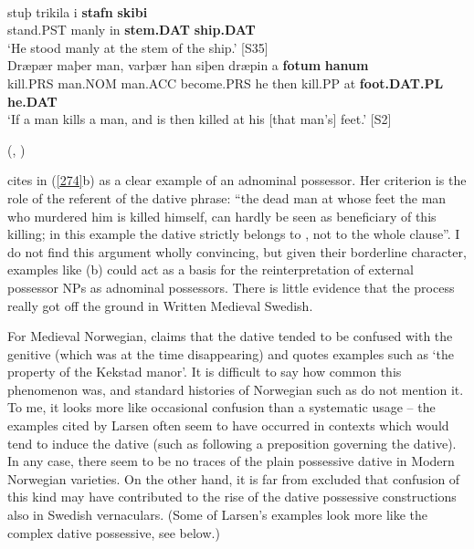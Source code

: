\ea\label{}
	\ea 
		\\
		\gll stuþ  trikila  i  \textbf{stafn} \textbf{skibi}\\
		stand.PST  manly  in  \textbf{stem.DAT} \textbf{ship.DAT}\\
		\glt ‘He stood manly at the stem of the ship.’ [S35]
	\ex 
		\\
		\gll Dræpær  maþer  man, varþær  han  siþen  dræpin  a  \textbf{fotum} \textbf{hanum}\\
		kill.PRS  man.NOM  man.ACC become.PRS  he  then  kill.PP  at  \textbf{foot.DAT.PL} \textbf{he.DAT}\\
		\glt ‘If a man kills a man, and is then killed at his [that man’s] feet.’ [S2]
	\z 
\z

(\citet[15]{Wessén1956}, \citet[211]{Norde1997})

\citet[212]{Norde1997} cites in (\ref{274}b) as a clear example of an adnominal possessor. Her criterion is the role of the referent of the dative phrase: “the dead man at whose feet the man who murdered him is killed himself, can hardly be seen as beneficiary of this killing; in this example the dative  strictly belongs to , not to the whole clause”. I do not find this argument wholly convincing, but given their borderline character, examples like (b) could act as a basis for the reinterpretation of external possessor NPs as adnominal possessors. There is little evidence that the process really got off the ground in Written Medieval Swedish.

For Medieval Norwegian, \citet{Larsen1895} claims that the dative tended to be confused with the genitive (which was at the time disappearing) and quotes examples such as  ‘the property of the Kekstad manor’. It is difficult to say how common this phenomenon was, and standard histories of Norwegian such as \citet{SeipEtAl} do not mention it. To me, it looks more like occasional confusion than a systematic usage – the examples cited by Larsen often seem to have occurred in contexts which would tend to induce the dative (such as following a preposition governing the dative). In any case, there seem to be no traces of the plain possessive dative in Modern Norwegian varieties. On the other hand, it is far from excluded that confusion of this kind may have contributed to the rise of the dative possessive constructions also in Swedish vernaculars. (Some of Larsen’s examples look more like the complex dative possessive, see below.)

